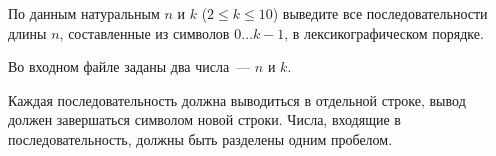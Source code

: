 По данным натуральным $n$ и $k$ ($2 \le k \le 10$) выведите все последовательности длины $n$, составленные из символов $0 \dots k-1$, в лексикографическом порядке.

\InputFile

Во входном файле заданы два числа~--- $n$ и $k$.

\OutputFile

Каждая последовательность должна выводиться в отдельной строке, вывод должен завершаться символом новой строки.
Числа, входящие в последовательность, должны быть разделены одним пробелом.


